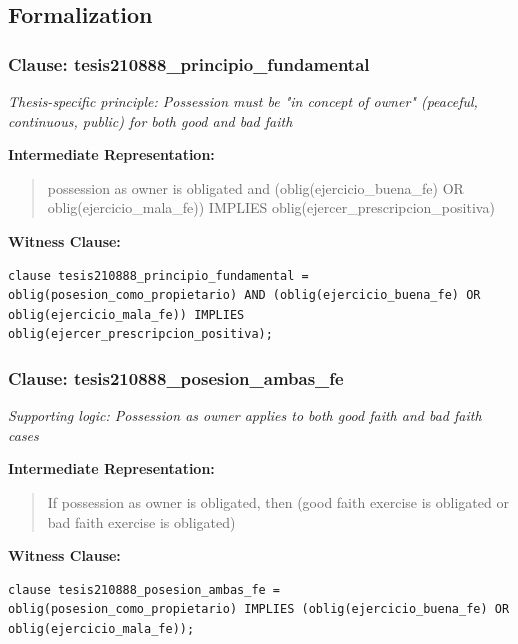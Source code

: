 \documentclass[11pt,a4paper]{article}
\begin{document}
\subsection{Formalization}

\subsubsection{Clause: tesis210888\_principio\_fundamental}

\textit{Thesis-specific principle: Possession must be "in concept of owner" (peaceful, continuous, public) for both good and bad faith}

\textbf{Intermediate Representation:}

\begin{quote}
possession as owner is obligated and (oblig(ejercicio\_buena\_fe) OR oblig(ejercicio\_mala\_fe)) IMPLIES oblig(ejercer\_prescripcion\_positiva)
\end{quote}

\textbf{Witness Clause:}

\begin{lstlisting}[style=witnessstyle, language=Witness]
clause tesis210888_principio_fundamental = oblig(posesion_como_propietario) AND (oblig(ejercicio_buena_fe) OR oblig(ejercicio_mala_fe)) IMPLIES oblig(ejercer_prescripcion_positiva);
\end{lstlisting}

\subsubsection{Clause: tesis210888\_posesion\_ambas\_fe}

\textit{Supporting logic: Possession as owner applies to both good faith and bad faith cases}

\textbf{Intermediate Representation:}

\begin{quote}
If possession as owner is obligated, then (good faith exercise is obligated or bad faith exercise is obligated)
\end{quote}

\textbf{Witness Clause:}

\begin{lstlisting}[style=witnessstyle, language=Witness]
clause tesis210888_posesion_ambas_fe = oblig(posesion_como_propietario) IMPLIES (oblig(ejercicio_buena_fe) OR oblig(ejercicio_mala_fe));
\end{lstlisting}
\end{document}
